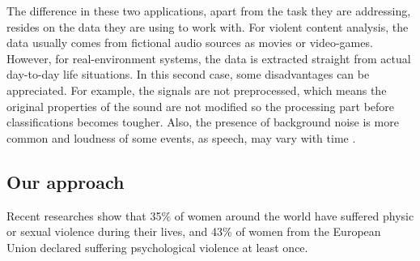 The difference in these two applications, apart from the task they are addressing, resides on the data they are using to work with. For violent content analysis, the data usually comes from fictional audio sources as movies or video-games. However, for real-environment systems, the data is extracted straight from actual day-to-day life situations. In this second case, some disadvantages can be appreciated. For example, the signals are not preprocessed, which means the original properties of the sound are not modified so the processing part before classifications becomes tougher. Also, the presence of background noise is more common and loudness of some events, as speech, may vary with time \cite{Bautista-Duran2017}. 

\subsection{Our approach}
Recent researches show that 35\% of women around the world have suffered physic or sexual violence during their lives, and 43\% of women from the European Union declared suffering psychological violence at least once.